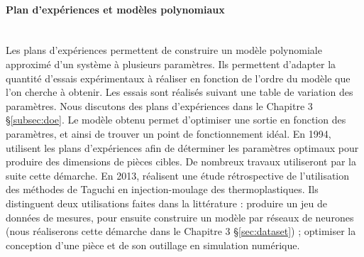 \paragraph{Plan d'expériences et modèles polynomiaux}\mbox{} \\
Les plans d’expériences permettent de construire un modèle polynomiale approximé d’un système à plusieurs paramètres.
Ils permettent d'adapter la quantité d’essais expérimentaux à réaliser en fonction de l'ordre du modèle que l'on cherche à obtenir.
Les essais sont réalisés suivant une table de variation des paramètres.
Nous discutons des plans d'expériences dans le Chapitre 3 §\ref{subsec:doe}.
Le modèle obtenu permet d'optimiser une sortie en fonction des paramètres, et ainsi de trouver un point de fonctionnement idéal.
En 1994, \cite{blyskal_applying_1994} utilisent les plans d’expériences afin de déterminer les paramètres optimaux pour produire des dimensions de pièces cibles.
De nombreux travaux utiliseront par la suite cette démarche.
En 2013, \cite{fei_practical_2013} réalisent une étude rétrospective de l’utilisation des méthodes de Taguchi en injection-moulage des thermoplastiques.
Ils distinguent deux utilisations faites dans la littérature : produire un jeu de données de mesures, pour ensuite construire un modèle par réseaux de neurones (nous réaliserons cette démarche dans le Chapitre 3 §\ref{sec:dataset}) ; optimiser la conception d’une pièce et de son outillage en simulation numérique.

